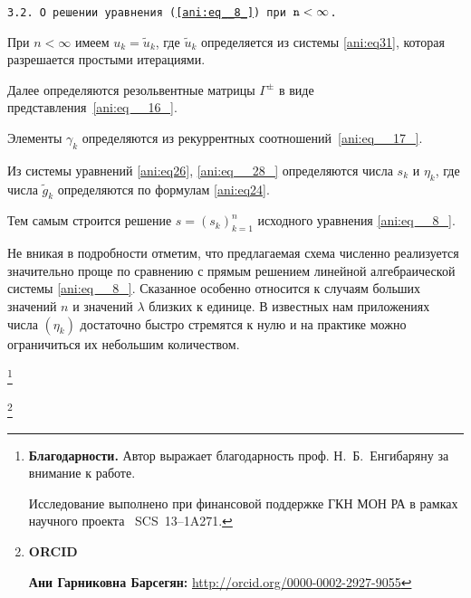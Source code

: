 \smallskip



\texttt{3.2. О решении уравнения (\ref{ani:eq__8_}) при $\tt n<\infty$.}

При $n<\infty$ имеем $u_{k} =\tilde{u}_{k}$, где $\tilde{u}_{k}$ определяется из системы \eqref{ani:eq31}, которая разрешается простыми итерациями. 

Далее определяются резольвентные матрицы $ \Gamma^\pm$ в виде представления~\eqref{ani:eq__16_}.

Элементы $\gamma_k$ определяются из рекуррентных соотношений~\eqref{ani:eq__17_}.



Из системы уравнений \eqref{ani:eq26}, \eqref{ani:eq__28_} определяются числа $s_{k} $ и $\eta_{k} $, где числа $\tilde{g}_{k} $ определяются по формулам \eqref{ani:eq24}.

Тем самым строится решение $s=\left(s_{k} \right)_{k=1}^{n} $ исходного уравнения \eqref{ani:eq__8_}.



Не вникая в подробности отметим, что предлагаемая схема численно реализуется значительно проще по сравнению с прямым решением линейной алгебраической системы \eqref{ani:eq__8_}. Сказанное особенно относится к случаям больших значений $n$ и значений $\lambda$ близких к единице. В известных нам приложениях числа $(\eta_k) $ достаточно быстро стремятся к нулю и на практике можно ограничиться их небольшим количеством.







\thanks{\textbf{Благодарности.} Автор выражает благодарность проф. Н.~Б.~Енгибаряну за внимание к работе.

Исследование выполнено при финансовой поддержке ГКН МОН РА в рамках научного проекта \No~SCS~13--1A271.}





\thanks{{\bf ORCID}



{\bf Ани Гарниковна Барсегян:}    \url{http://orcid.org/0000-0002-2927-9055}







}




